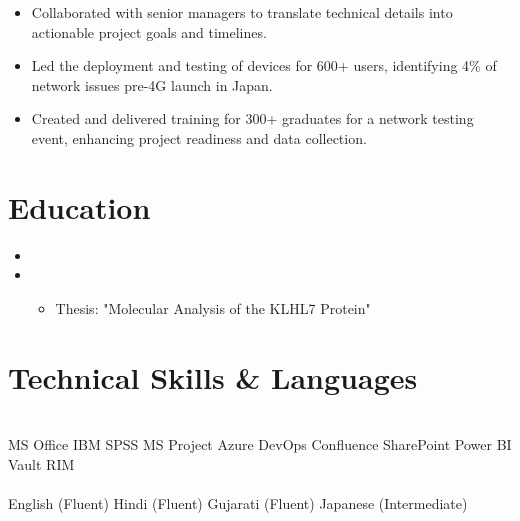 \documentclass[a4paper]{deedy-resume} %
\begin{document}
\vspace{-10pt}
\begin{multicols}{2}
    \begin{itemize}
        \item Collaborated with senior managers to translate technical details into actionable project goals and timelines.
        \item Led the deployment and testing of devices for 600+ users, identifying 4\% of network issues pre-4G launch in Japan.
        \item Created and delivered training for 300+ graduates for a network testing event, enhancing project readiness and data collection.
    \end{itemize}
\end{multicols}
\vspace{-10pt}
\section{Education}
\begin{itemize}
    \item {}
    \item {}
    \vspace{-2pt}
    \begin{itemize}
        \item Thesis: "Molecular Analysis of the KLHL7 Protein"
    \end{itemize}
\end{itemize}
\vspace{-5pt}
\section{Technical Skills \& Languages}
\vspace{-10pt}
\begin{multicols}{2}
 \\
MS Office \textbullet{} IBM SPSS \textbullet{} MS Project \textbullet{} Azure DevOps \textbullet{} Confluence \textbullet{} SharePoint \textbullet{} Power BI \textbullet{} Vault RIM
\columnbreak
\\  \\
English (Fluent) \textbullet{} Hindi (Fluent) \textbullet{} Gujarati (Fluent) \textbullet{} Japanese (Intermediate)
\end{multicols}
\end{document}
